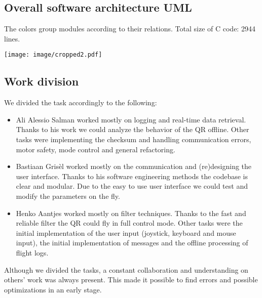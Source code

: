 \documentclass[a4paper]{article}
\begin{document}
\subsection{Overall software architecture UML}
The colors group modules according to their relations. Total size of C code: 2944 lines.\\
\centerline{\texttt{[image: image/cropped2.pdf]}}

\subsection{Work division}
We divided the task accordingly to the following: 
\begin{itemize}
\setlength\itemsep{0em}
\item Ali Alessio Salman worked mostly on logging and real-time data retrieval. Thanks to his work we could analyze the behavior of the QR offline. Other tasks were implementing the checksum and handling communication errors, motor safety, mode control and general refactoring.
\item Bastiaan Gris\`el worked mostly on the communication and (re)designing the user interface. Thanks to his software engineering methods the codebase is clear and modular. Due to the easy to use user interface we could test and modify the parameters on the fly.
\item Henko Aantjes worked mostly on filter techniques. Thanks to the fast and reliable filter the QR could fly in full control mode. Other tasks were the initial implementation of the user input (joystick, keyboard and mouse input), the initial implementation of messages and the offline processing of flight logs.
\end{itemize}
Although we divided the tasks, a constant collaboration and understanding on others' work was always present. This made it possible to find errors and possible optimizations in an early stage.
\end{document}

